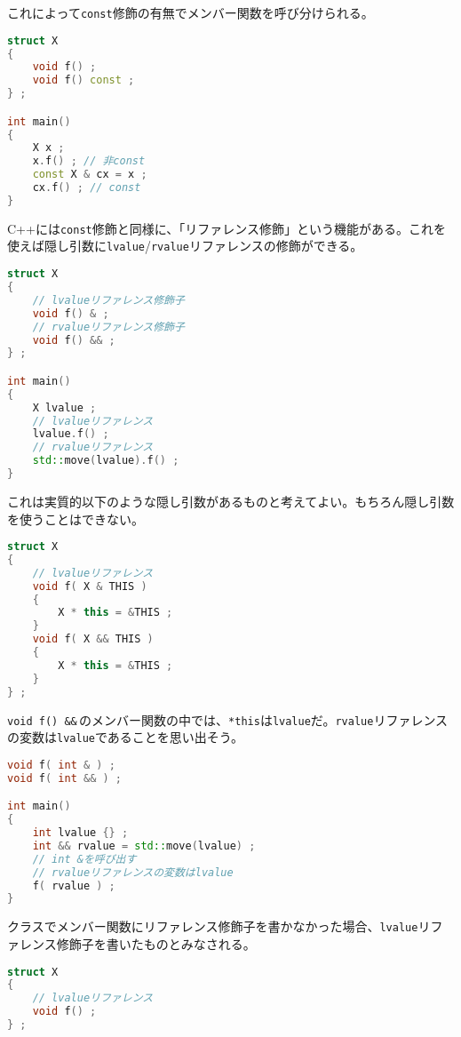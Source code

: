 これによって\texttt{const}修飾の有無でメンバー関数を呼び分けられる。

\begin{lstlisting}[language={C++}]
struct X
{
    void f() ;
    void f() const ; 
} ;

int main()
{
    X x ;
    x.f() ; // 非const
    const X & cx = x ;
    cx.f() ; // const
}
\end{lstlisting}

C++には\texttt{const}修飾と同様に、「リファレンス修飾」という機能がある。これを使えば隠し引数に\texttt{lvalue}/\texttt{rvalue}リファレンスの修飾ができる。

\begin{lstlisting}[language={C++}]
struct X
{
    // lvalueリファレンス修飾子
    void f() & ;
    // rvalueリファレンス修飾子
    void f() && ; 
} ;

int main()
{
    X lvalue ;
    // lvalueリファレンス
    lvalue.f() ;
    // rvalueリファレンス
    std::move(lvalue).f() ;
}
\end{lstlisting}

これは実質的以下のような隠し引数があるものと考えてよい。もちろん隠し引数を使うことはできない。

\ifTombow\pagebreak\fi
\begin{lstlisting}[language={C++}]
struct X
{
    // lvalueリファレンス
    void f( X & THIS )
    {
        X * this = &THIS ;
    }
    void f( X && THIS )
    {
        X * this = &THIS ;
    }
} ;
\end{lstlisting}

\texttt{void f() \&\&}\,のメンバー関数の中では、\texttt{*this}は\texttt{lvalue}だ。\texttt{rvalue}リファレンスの変数は\texttt{lvalue}であることを思い出そう。

\begin{lstlisting}[language={C++}]
void f( int & ) ;
void f( int && ) ;

int main()
{
    int lvalue {} ;
    int && rvalue = std::move(lvalue) ;
    // int &を呼び出す
    // rvalueリファレンスの変数はlvalue
    f( rvalue ) ;
}
\end{lstlisting}

クラスでメンバー関数にリファレンス修飾子を書かなかった場合、\texttt{lvalue}リファレンス修飾子を書いたものとみなされる。

\begin{lstlisting}[language={C++}]
struct X
{
    // lvalueリファレンス
    void f() ;
} ;
\end{lstlisting}

